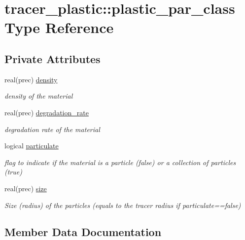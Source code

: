 \hypertarget{structtracer__plastic_1_1plastic__par__class}{}\section{tracer\+\_\+plastic\+:\+:plastic\+\_\+par\+\_\+class Type Reference}
\label{structtracer__plastic_1_1plastic__par__class}
\subsection*{Private Attributes}
\begin{DoxyCompactItemize}
\item 
real(prec) \mbox{\hyperlink{structtracer__plastic_1_1plastic__par__class_af0ae9b2aec29bff71a16780c5f75c8e2}{density}}
\begin{DoxyCompactList}\small\item\em density of the material \end{DoxyCompactList}\item 
real(prec) \mbox{\hyperlink{structtracer__plastic_1_1plastic__par__class_afce16ca3606bcfc7f4455c46232aa057}{degradation\+\_\+rate}}
\begin{DoxyCompactList}\small\item\em degradation rate of the material \end{DoxyCompactList}\item 
logical \mbox{\hyperlink{structtracer__plastic_1_1plastic__par__class_abf8dcf5f65aef6d095a75a2d10dc5517}{particulate}}
\begin{DoxyCompactList}\small\item\em flag to indicate if the material is a particle (false) or a collection of particles (true) \end{DoxyCompactList}\item 
real(prec) \mbox{\hyperlink{structtracer__plastic_1_1plastic__par__class_ae7f5294e339ec13e0d5f0213fe66e026}{size}}
\begin{DoxyCompactList}\small\item\em Size (radius) of the particles (equals to the tracer radius if particulate==false) \end{DoxyCompactList}\end{DoxyCompactItemize}


\subsection{Member Data Documentation}
\mbox{\label{structtracer__plastic_1_1plastic__par__class_afce16ca3606bcfc7f4455c46232aa057}} 
